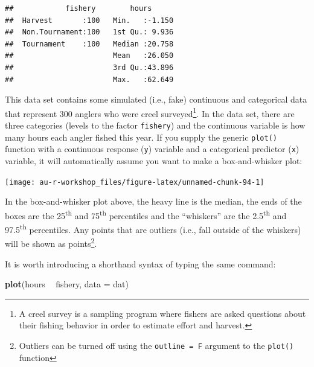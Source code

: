 \documentclass[]{book}
\newenvironment{Shaded}{\begin{snugshade}}{\end{snugshade}}
\newcommand{\KeywordTok}[1]{\textcolor[rgb]{0.13,0.29,0.53}{\textbf{#1}}}
\newcommand{\DataTypeTok}[1]{\textcolor[rgb]{0.13,0.29,0.53}{#1}}
\newcommand{\StringTok}[1]{\textcolor[rgb]{0.31,0.60,0.02}{#1}}
\newcommand{\OperatorTok}[1]{\textcolor[rgb]{0.81,0.36,0.00}{\textbf{#1}}}
\newcommand{\NormalTok}[1]{#1}
\let\rmarkdownfootnote\footnote%
\def\footnote{\protect\rmarkdownfootnote}
\theoremstyle{definition}
\theoremstyle{definition}
\theoremstyle{definition}
\theoremstyle{remark}
\begin{document}
\begin{verbatim}
##            fishery        hours       
##  Harvest       :100   Min.   :-1.150  
##  Non.Tournament:100   1st Qu.: 9.936  
##  Tournament    :100   Median :20.758  
##                       Mean   :26.050  
##                       3rd Qu.:43.896  
##                       Max.   :62.649
\end{verbatim}

This data set contains some simulated (i.e., fake) continuous and
categorical data that represent 300 anglers who were creel
surveyed\footnote{A creel survey is a sampling program where fishers are
  asked questions about their fishing behavior in order to estimate
  effort and harvest.}. In the data set, there are three categories
(levels to the factor \texttt{fishery}) and the continuous variable is
how many hours each angler fished this year. If you supply the generic
\texttt{plot()} function with a continuous response (\texttt{y})
variable and a categorical predictor (\texttt{x}) variable, it will
automatically assume you want to make a box-and-whisker plot:

\begin{Shaded}
\end{Shaded}

\begin{center}\texttt{[image: au-r-workshop\_files/figure-latex/unnamed-chunk-94-1]} \end{center}

In the box-and-whisker plot above, the heavy line is the median, the
ends of the boxes are the 25\textsuperscript{th} and
75\textsuperscript{th} percentiles and the ``whiskers'' are the
2.5\textsuperscript{th} and 97.5\textsuperscript{th} percentiles. Any
points that are outliers (i.e., fall outside of the whiskers) will be
shown as points\footnote{Outliers can be turned off using the
  \texttt{outline\ =\ F} argument to the \texttt{plot()} function}.

It is worth introducing a shorthand syntax of typing the same command:

\begin{Shaded}
\begin{Highlighting}[]
\KeywordTok{plot}\NormalTok{(hours }\OperatorTok{~}\StringTok{ }\NormalTok{fishery, }\DataTypeTok{data =}\NormalTok{ dat)}
\end{Highlighting}
\end{Shaded}
\end{document}

